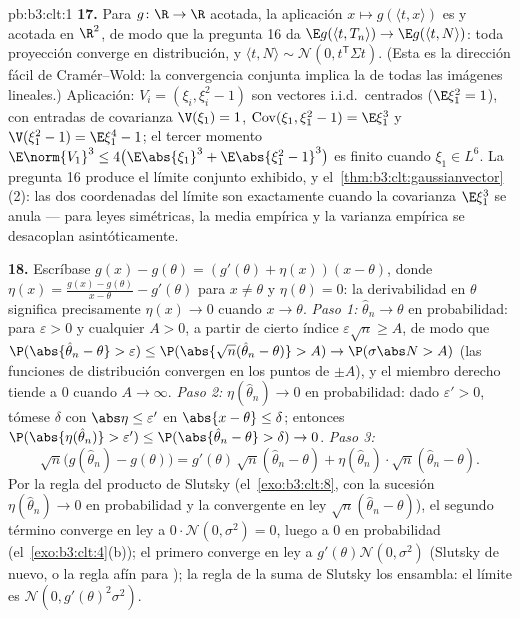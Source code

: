 \begin{solution}{pb:b3:clt:1}
\textbf{17.} Para $g \colon \R \to \R$
 acotada, la aplicación
$x \mapsto g(\langle t, x\rangle)$ es
 y acotada en $\R^2$, de
modo que la pregunta 16 da $\E g(\langle
t, T_n\rangle) \to \E g(\langle t, N\rangle)$: toda proyección converge
en distribución, y $\langle t,
N\rangle \sim \mathcal N(0, t^{\mathsf T}\Sigma t)$. (Esta es la
dirección fácil de Cramér--Wold: la convergencia conjunta implica la de
todas las imágenes lineales.) Aplicación: $V_i = (\xi_i, \xi_i^2 - 1)$
son vectores i.i.d.\ centrados ($\E\xi_1^2 = 1$), con entradas de
covarianza $\V(\xi_1) =
1$, $\operatorname{Cov}(\xi_1, \xi_1^2 - 1) = \E\xi_1^3$ y
$\V(\xi_1^2 - 1) = \E\xi_1^4 - 1$; el tercer momento
$\E\norm{V_1}^3 \leq 4\bigl(\E\abs{\xi_1}^3 +
\E\abs{\xi_1^2 - 1}^3\bigr)$ es finito cuando $\xi_1 \in
L^6$. La pregunta 16 produce el límite
 conjunto exhibido, y
el~\cref{thm:b3:clt:gaussianvector}(2): las dos coordenadas del límite
son  exactamente
cuando la covarianza $\E\xi_1^3$ se anula --- para leyes simétricas, la
media empírica y la varianza empírica se desacoplan asintóticamente.

\textbf{18.} Escríbase $g(x) - g(\theta) = (g'(\theta) +
\eta(x))(x - \theta)$, donde $\eta(x) = \frac{g(x) -
g(\theta)}{x - \theta} - g'(\theta)$ para $x \neq \theta$ y
$\eta(\theta) = 0$: la derivabilidad en $\theta$ significa precisamente
$\eta(x) \to 0$ cuando $x \to \theta$. \emph{Paso 1:}
$\hat\theta_n \to \theta$ en probabilidad: para $\varepsilon > 0$ y
cualquier $A > 0$, a partir de cierto índice
$\varepsilon\sqrt n \geq A$, de modo que $\P(\abs{\hat\theta_n -
\theta} > \varepsilon) \leq \P(\abs{\sqrt
n(\hat\theta_n - \theta)} > A) \to \P(\sigma\abs N > A)$ (las funciones
de distribución convergen en los puntos de
 $\pm A$), y el miembro
derecho tiende a $0$ cuando $A \to
\infty$. \emph{Paso 2:} $\eta(\hat\theta_n) \to 0$ en probabilidad: dado
$\varepsilon' > 0$, tómese $\delta$ con $\abs\eta \leq \varepsilon'$ en
$\abs{x - \theta} \leq
\delta$; entonces $\P(\abs{\eta(\hat\theta_n)} > \varepsilon')
\leq \P(\abs{\hat\theta_n - \theta} > \delta) \to 0$. \emph{Paso 3:}
\[
\sqrt n\bigl(g(\hat\theta_n) - g(\theta)\bigr) =
g'(\theta)\,\sqrt n(\hat\theta_n - \theta) +
\eta(\hat\theta_n)\cdot\sqrt n(\hat\theta_n - \theta) .
\]
Por la regla del producto de Slutsky (el~\cref{exo:b3:clt:8}, con la
sucesión $\eta(\hat\theta_n) \to 0$ en probabilidad y la convergente en
ley $\sqrt n(\hat\theta_n - \theta)$), el segundo término converge en
ley a $0\cdot\mathcal N(0,
\sigma^2) = 0$, luego a $0$ en probabilidad (el~\cref{exo:b3:clt:4}(b));
el primero converge en ley a $g'(\theta)\mathcal N(0, \sigma^2)$
(Slutsky de nuevo, o la regla afín para ); la regla de la suma de Slutsky los ensambla: el
límite es $\mathcal N(0,
g'(\theta)^2\sigma^2)$.


\end{solution}
